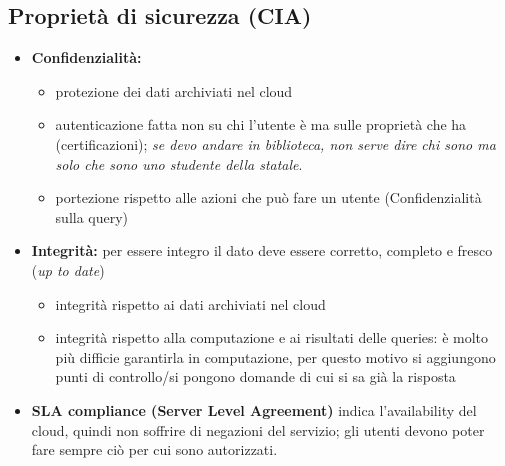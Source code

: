 \documentclass{report}
\begin{document}
\subsection{Proprietà di sicurezza (CIA)}
\begin{itemize}
    \item \textbf{ Confidenzialità:}
    \begin{itemize}
        \item protezione dei dati archiviati nel cloud
        \item autenticazione fatta non su chi l'utente è ma sulle proprietà che ha (certificazioni); \textit{se devo andare in biblioteca, non serve dire chi sono ma solo che
        sono uno studente della statale}.
        \item portezione rispetto alle azioni che può fare un utente (Confidenzialità sulla query)
    \end{itemize}
    \item \textbf{Integrità: }
    per essere integro il dato deve essere corretto, completo e fresco (\textit{up to date})
    \begin{itemize}
        \item integrità rispetto ai dati archiviati nel cloud
        \item integrità rispetto alla computazione e ai risultati delle queries: è molto più difficie garantirla in computazione,
        per questo motivo si aggiungono punti di controllo/si pongono domande di cui si sa già la risposta 
    \end{itemize}
    \item \textbf{SLA compliance (Server Level Agreement)}
    indica l'availability del cloud, quindi non soffrire di negazioni del servizio; gli utenti devono poter fare sempre ciò per 
    cui sono autorizzati.
\end{itemize}
\end{document}

